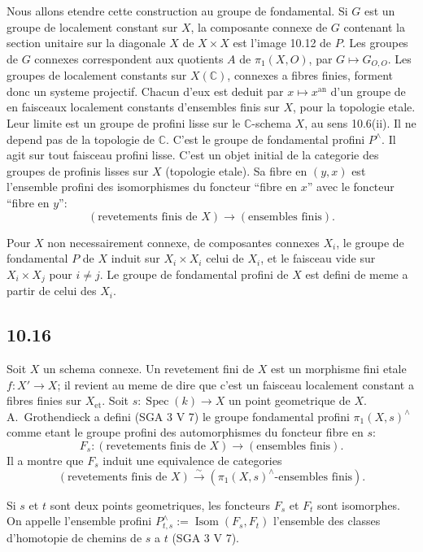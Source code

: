 \documentclass[12pt,a4paper]{article}
\theoremstyle{plain}
\theoremstyle{definition}
\theoremstyle{remark}
\DeclareMathOperator{\Spec}{Spec}
\DeclareMathOperator{\Isom}{Isom}
\newcommand{\C}{\mathbb{C}}
\begin{document}
Nous allons etendre cette construction au groupe de fondamental. Si $G$ est un groupe de localement constant sur $X$, la composante connexe de $G$ contenant la section unitaire sur la diagonale $X$ de $X \times X$ est l'image 10.12 de $P$. Les groupes de $G$ connexes correspondent aux quotients $A$ de $\pi_1(X, O)$, par $G \mapsto G_{O,O}$. Les groupes de localement constants sur $X(\C)$, connexes a fibres finies, forment donc un systeme projectif. Chacun d'eux est deduit par $x \mapsto x^{\mathrm{an}}$ d'un groupe de en faisceaux localement constants d'ensembles finis sur $X$, pour la topologie etale. Leur limite est un groupe de profini lisse sur le $\C$-schema $X$, au sens 10.6(ii). Il ne depend pas de la topologie de $\C$. C'est le groupe de fondamental profini $P^\wedge$. Il agit sur tout faisceau profini lisse. C'est un objet initial de la categorie des groupes de profinis lisses sur $X$ (topologie etale). Sa fibre en $(y,x)$ est l'ensemble profini des isomorphismes du foncteur ``fibre en $x$'' avec le foncteur ``fibre en $y$'':
$$(\text{revetements finis de } X) \longrightarrow (\text{ensembles finis}).$$

Pour $X$ non necessairement connexe, de composantes connexes $X_i$, le groupe de fondamental $P$ de $X$ induit sur $X_i \times X_i$ celui de $X_i$, et le faisceau vide sur $X_i \times X_j$ pour $i \neq j$. Le groupe de fondamental profini de $X$ est defini de meme a partir de celui des $X_i$.

\subsection*{10.16}

Soit $X$ un schema connexe. Un revetement fini de $X$ est un morphisme fini etale $f: X' \to X$; il revient au meme de dire que c'est un faisceau localement constant a fibres finies sur $X_{\text{et}}$. Soit $s: \Spec(k) \to X$ un point geometrique de $X$. A.~Grothendieck a defini (SGA 3 V 7) le groupe fondamental profini $\pi_1(X, s)^\wedge$ comme etant le groupe profini des automorphismes du foncteur fibre en $s$:
$$F_s: (\text{revetements finis de } X) \longrightarrow (\text{ensembles finis}).$$
Il a montre que $F_s$ induit une equivalence de categories
$$(\text{revetements finis de } X) \xrightarrow{\sim} (\pi_1(X, s)^\wedge\text{-ensembles finis}).$$

Si $s$ et $t$ sont deux points geometriques, les foncteurs $F_s$ et $F_t$ sont isomorphes. On appelle l'ensemble profini $P^\wedge_{t,s} := \Isom(F_s, F_t)$ l'ensemble des classes d'homotopie de chemins de $s$ a $t$ (SGA 3 V 7).
\end{document}
